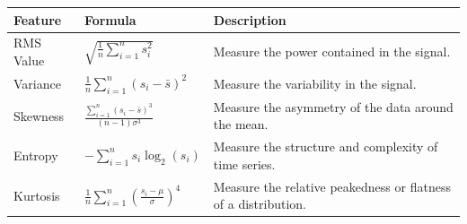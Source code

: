 \begin{table}[ht]
	\centering
	\begin{tabular}{|p{3cm}|p{3cm}|p{6cm}|}
		\hline
		\vspace{-1mm} \textbf{Feature} & \vspace{-1mm} \textbf{Formula} & \vspace{-1mm} \textbf{Description} \\[3ex]
		\hline

		\vspace{-1mm} RMS Value & \vspace{-1mm} \begin{math} \sqrt{\frac{1}{n}\sum_{i=1}^{n} s_{i}^{2} } \end{math} & \vspace{-1mm} Measure the power contained in the signal. \\[3ex]
		\hline

		\vspace{-1mm} Variance & \vspace{-1mm} \begin{math} \frac{1}{n} \sum_{i=1}^{n}(s_{i}-\bar{s})^2 \end{math} & \vspace{-1mm}  Measure the variability in the signal. \\[3ex]
		\hline
		
		\vspace{-1mm} Skewness & \vspace{-1mm} \begin{math} \frac{\sum_{i=1}^{n}(s_{i}-\bar{s})^3}{(n-1)\sigma^3} \end{math} & \vspace{-1mm} Measure the asymmetry of the data around the mean. \\[3ex]
		\hline
		
		\vspace{-1mm} Entropy & \vspace{-1mm} \begin{math} - \sum_{i=1}^{n} s_{i} \log_{2}{(s_{i})} \end{math} & \vspace{-1mm} Measure the structure and complexity of time series. \\[3ex]
		\hline
		
		\vspace{-1mm} Kurtosis & \vspace{-1mm} \begin{math} \frac{1}{n} \sum_{i=1}^{n} (\frac{s_{i}-\mu}{\sigma})^4	\end{math} & \vspace{-1mm} Measure the relative peakedness or flatness of a distribution. \\[3ex]
		\hline
		

\end{tabular}
\end{table}
